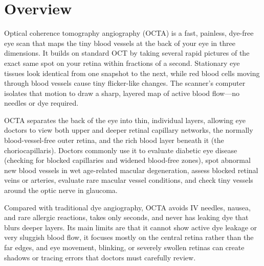 \label{ch:infographic-octa}

\section{Overview}

Optical coherence tomography angiography (OCTA) is a fast, painless, dye-free eye scan that maps the tiny blood vessels at the back of your eye in three dimensions. It builds on standard OCT by taking several rapid pictures of the exact same spot on your retina within fractions of a second. Stationary eye tissues look identical from one snapshot to the next, while red blood cells moving through blood vessels cause tiny flicker-like changes. The scanner's computer isolates that motion to draw a sharp, layered map of active blood flow---no needles or dye required.

OCTA separates the back of the eye into thin, individual layers, allowing eye doctors to view both upper and deeper retinal capillary networks, the normally blood-vessel-free outer retina, and the rich blood layer beneath it (the choriocapillaris). Doctors commonly use it to evaluate diabetic eye disease (checking for blocked capillaries and widened blood-free zones), spot abnormal new blood vessels in wet age-related macular degeneration, assess blocked retinal veins or arteries, evaluate rare macular vessel conditions, and check tiny vessels around the optic nerve in glaucoma.

Compared with traditional dye angiography, OCTA avoids IV needles, nausea, and rare allergic reactions, takes only seconds, and never has leaking dye that blurs deeper layers. Its main limits are that it cannot show active dye leakage or very sluggish blood flow, it focuses mostly on the central retina rather than the far edges, and eye movement, blinking, or severely swollen retinas can create shadows or tracing errors that doctors must carefully review.

